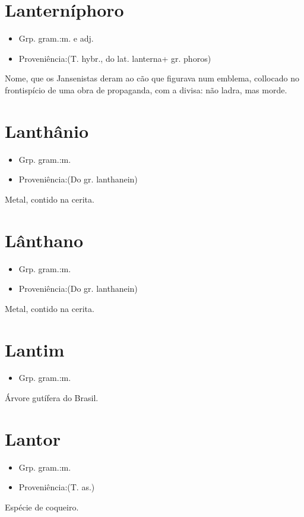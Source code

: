 \section{Lanterníphoro}
\begin{itemize}
\item {Grp. gram.:m.  e  adj.}
\end{itemize}
\begin{itemize}
\item {Proveniência:(T. hybr., do lat. \textunderscore lanterna\textunderscore  + gr. \textunderscore phoros\textunderscore )}
\end{itemize}
Nome, que os Jansenistas deram ao cão que figurava num emblema, collocado no frontispício de uma obra de propaganda, com a divisa: \textunderscore não ladra, mas morde\textunderscore .
\section{Lanthânio}
\begin{itemize}
\item {Grp. gram.:m.}
\end{itemize}
\begin{itemize}
\item {Proveniência:(Do gr. \textunderscore lanthanein\textunderscore )}
\end{itemize}
Metal, contido na cerita.
\section{Lânthano}
\begin{itemize}
\item {Grp. gram.:m.}
\end{itemize}
\begin{itemize}
\item {Proveniência:(Do gr. \textunderscore lanthanein\textunderscore )}
\end{itemize}
Metal, contido na cerita.
\section{Lantim}
\begin{itemize}
\item {Grp. gram.:m.}
\end{itemize}
Árvore gutífera do Brasil.
\section{Lantor}
\begin{itemize}
\item {Grp. gram.:m.}
\end{itemize}
\begin{itemize}
\item {Proveniência:(T. as.)}
\end{itemize}
Espécie de coqueiro.
